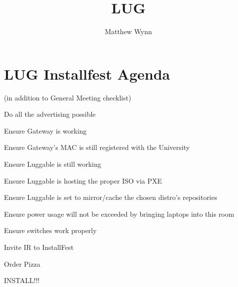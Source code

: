 \documentclass[12pt,letterpaper,oneside]{article}
\title{LUG}
\author{Matthew Wynn}
\newenvironment{checklist}{%
	\begin{list}{}{}%
	\let\olditem\item
	\renewcommand\item{\olditem[$\Box$] }
	}{%
	\end{list}
}
\begin{document}
\section*{LUG Installfest Agenda} (in addition to General Meeting checklist)
\begin{checklist}
	\item Do all the advertising possible
	\item Ensure Gateway is working
	\item Ensure Gateway's MAC is still registered with the University
	\item Ensure Luggable is still working
	\item Ensure Luggable is hosting the proper ISO via PXE
	\item Ensure Luggable is set to mirror/cache the chosen distro's repositories
	\item Ensure power usage will not be exceeded by bringing laptops into this room
	\item Ensure switches work properly
	\item Invite IR to InstallFest
	\item Order Pizza
	\item INSTALL!!!
\end{checklist}
\end{document}
